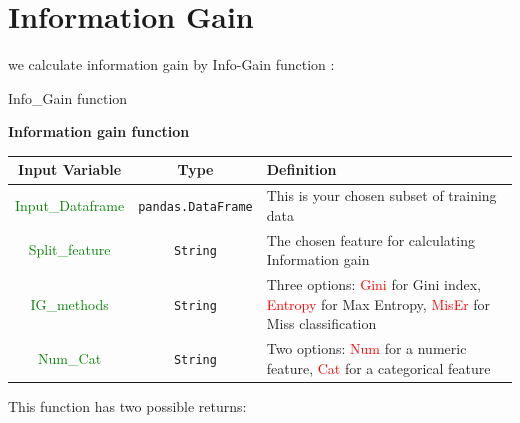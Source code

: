 \documentclass{article}
\begin{document}
\section{Information Gain}
we calculate information gain by Info-Gain function :

\begin{algorithm}[H]
\SetAlgoLined
{}



\caption{Info\_Gain function}
\end{algorithm}

\textbf{Information gain function}

\begin{center}
\begin{tabular}{|c|c|p{7cm}|}
\hline
\textbf{Input Variable} & \textbf{Type} & \textbf{Definition} \\
\hline
\textcolor{green}{Input\_Dataframe} & \texttt{pandas.DataFrame} & This is your chosen subset of training data \\
\textcolor{green}{Split\_feature} & \texttt{String} & The chosen feature for calculating Information gain \\
\textcolor{green}{IG\_methods} & \texttt{String} & Three options: \textcolor{red}{Gini} for Gini index, \textcolor{red}{Entropy} for Max Entropy, \textcolor{red}{MisEr} for Miss classification\\
\textcolor{green}{Num\_Cat} & \texttt{String} & Two options: \textcolor{red}{Num} for a numeric feature, \textcolor{red}{Cat} for a categorical feature \\
\hline
\end{tabular}
\end{center}

This function has two possible returns: 
\end{document}
